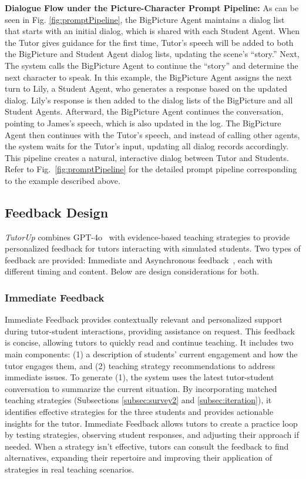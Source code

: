 \textbf{Dialogue Flow under the Picture-Character Prompt Pipeline:} As can be seen in Fig. \ref{fig:promptPipeline}, the BigPicture Agent maintains a dialog list that starts with an initial dialog, which is shared with each Student Agent. When the Tutor gives guidance for the first time, Tutor's speech will be added to both the BigPicture and Student Agent dialog lists, updating the scene’s ``story.'' Next, The system calls the BigPicture Agent to continue the ``story'' and determine the next character to speak. In this example, the BigPicture Agent assigns the next turn to Lily, a Student Agent, who generates a response based on the updated dialog. Lily's response is then added to the dialog lists of the BigPicture and all Student Agents. Afterward, the BigPicture Agent continues the conversation, pointing to James's speech, which is also updated in the log. The BigPicture Agent then continues with the Tutor's speech, and instead of calling other agents, the system waits for the Tutor's input, updating all dialog records accordingly. This pipeline creates a natural, interactive dialog between Tutor and Students. Refer to Fig.~\ref{fig:promptPipeline} for the detailed prompt pipeline corresponding to the example described above.


\subsection{Feedback Design}
\textit{TutorUp} combines GPT-4o~\cite{openai2023chatgpt4} with evidence-based teaching strategies to provide personalized feedback for tutors interacting with simulated students. Two types of feedback are provided: Immediate and Asynchronous feedback~\cite{wong2017using}, each with different timing and content. Below are design considerations for both.


\subsubsection{Immediate Feedback} Immediate Feedback provides contextually relevant and personalized support during tutor-student interactions, providing assistance on request. This feedback is concise, allowing tutors to quickly read and continue teaching. It includes two main components: (1) a description of students' current engagement and how the tutor engages them, and (2) teaching strategy recommendations to address immediate issues. To generate (1), the system uses the latest tutor-student conversation to summarize the current situation. By incorporating matched teaching strategies (Subsections \ref{subsec:survey2} and \ref{subsec:iteration}), it identifies effective strategies for the three students and provides actionable insights for the tutor.
%
Immediate Feedback allows tutors to create a practice loop by testing strategies, observing student responses, and adjusting their approach if needed. When a strategy isn’t effective, tutors can consult the feedback to find alternatives, expanding their repertoire and improving their application of strategies in real teaching scenarios.

